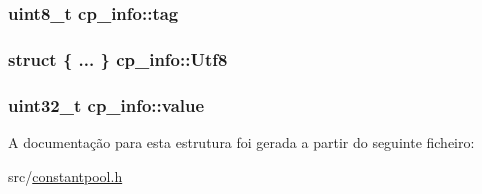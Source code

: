 \subsubsection[{\texorpdfstring{tag}{tag}}]{\setlength{\rightskip}{0pt plus 5cm}uint8\+\_\+t cp\+\_\+info\+::tag}\hypertarget{structcp__info_a29d87595bc993eb6cd53f30e8305ec74}{}\label{structcp__info_a29d87595bc993eb6cd53f30e8305ec74}
\subsubsection[{\texorpdfstring{Utf8}{Utf8}}]{\setlength{\rightskip}{0pt plus 5cm}struct \{ ... \}   cp\+\_\+info\+::\+Utf8}\hypertarget{structcp__info_a25ee4592009bd74535de00796abf40eb}{}\label{structcp__info_a25ee4592009bd74535de00796abf40eb}
\subsubsection[{\texorpdfstring{value}{value}}]{\setlength{\rightskip}{0pt plus 5cm}uint32\+\_\+t cp\+\_\+info\+::value}\hypertarget{structcp__info_abdf544fc1b14cb7bfcb5ecabb74a0e84}{}\label{structcp__info_abdf544fc1b14cb7bfcb5ecabb74a0e84}


A documentação para esta estrutura foi gerada a partir do seguinte ficheiro\+:\begin{DoxyCompactItemize}
\item 
src/\hyperlink{constantpool_8h}{constantpool.\+h}\end{DoxyCompactItemize}
